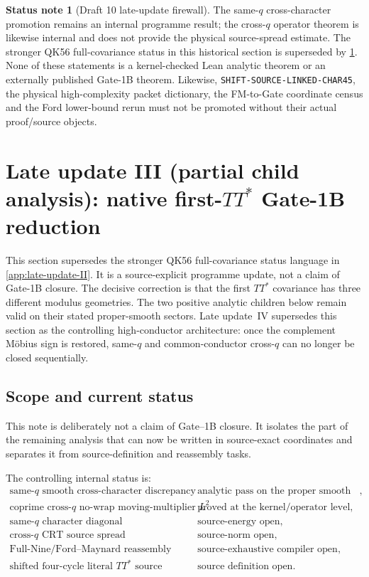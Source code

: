 \documentclass[11pt]{article}
\theoremstyle{definition}
\newtheorem{status}[status]{Status note}
\newcommand{\1}{\mathbf 1}
\begin{document}
\begin{status}[Draft 10 late-update firewall]
The same-$q$ cross-character promotion remains an internal programme result;
the cross-$q$ operator theorem is likewise internal and does not provide the
physical source-spread estimate.  The stronger QK56 full-covariance status in
this historical section is superseded by \cref{app:native-ttstar}.  None of
these statements is a kernel-checked Lean analytic theorem or an externally
published Gate-1B theorem.  Likewise, \texttt{SHIFT-SOURCE-LINKED-CHAR45}, the
physical high-complexity packet dictionary, the FM-to-Gate coordinate census
and the Ford lower-bound rerun must not be promoted without their actual
proof/source objects.
\end{status}



\section{Late update III (partial child analysis): native first-\texorpdfstring{$TT^\ast$}{TT*} Gate-1B reduction}
\label{app:native-ttstar}

This section supersedes the stronger QK56 full-covariance status language in
\cref{app:late-update-II}.  It is a source-explicit programme update, not a
claim of Gate-1B closure.  The decisive correction is that the first
$TT^\ast$ covariance has three different modulus geometries.  The two
positive analytic children below remain valid on their stated proper-smooth
sectors.  Late update~IV supersedes this section as the controlling
high-conductor architecture: once the complement M\"obius sign is restored,
same-$q$ and common-conductor cross-$q$ can no longer be closed sequentially.

\subsection{Scope and current status}

This note is deliberately not a claim of Gate--1B closure.  It isolates the
part of the remaining analysis that can now be written in source-exact
coordinates and separates it from source-definition and reassembly tasks.

The controlling internal status is:
\[
\begin{array}{ll}
\text{same-}q\text{ smooth cross-character discrepancy}
  & \text{analytic pass on the proper smooth sector},\\
\text{coprime cross-}q\text{ no-wrap moving-multiplier }L^2
  & \text{proved at the kernel/operator level},\\
\text{same-}q\text{ character diagonal}
  & \text{source-energy open},\\
\text{cross-}q\text{ CRT source spread}
  & \text{source-norm open},\\
\text{Full-Nine/Ford--Maynard reassembly}
  & \text{source-exhaustive compiler open},\\
\text{shifted four-cycle literal }TT^\ast\text{ source}
  & \text{source definition open}.
\end{array}
\]
\end{document}
